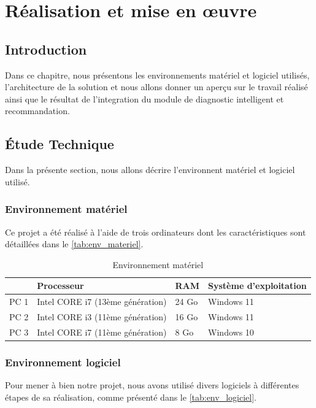 \chapter{Réalisation et mise en œuvre}
\section*{Introduction}
Dans ce chapitre, nous présentons les environnements matériel et logiciel utilisés,
l’architecture de la solution et nous allons donner un aperçu sur le travail réalisé ainsi
que le résultat de l'integration du module de diagnostic intelligent et recommandation.

\section{Étude Technique}
Dans la présente section, nous allons décrire l’environnent matériel et logiciel utilisé.
    \subsection{Environnement matériel}
    Ce projet a été réalisé à l’aide de trois ordinateurs dont les caractéristiques sont détaillées dans
le \autoref{tab:env_materiel}.

        \begin{table}[H]
        \centering
        \begin{tabular}{|l|l|l|l|}
        \hline
        \textbf{} & \textbf{Processeur} & \textbf{RAM} & \textbf{Système d'exploitation} \\
        \hline
        PC 1 & Intel CORE i7 (13ème génération) & 24 Go & Windows 11 \\
        \hline
        PC 2 & Intel CORE i3 (11ème génération) & 16 Go & Windows 11 \\
        \hline
        PC 3 & Intel CORE i7 (11ème génération) & 8 Go & Windows 10 \\
        \hline
        \end{tabular}
        \caption{Environnement matériel}
        \label{tab:env_materiel}
        \end{table}
    \subsection{Environnement logiciel}

Pour mener à bien notre projet, nous avons utilisé divers logiciels à différentes étapes de sa
réalisation, comme présenté dans le \autoref{tab:env_logiciel}.

